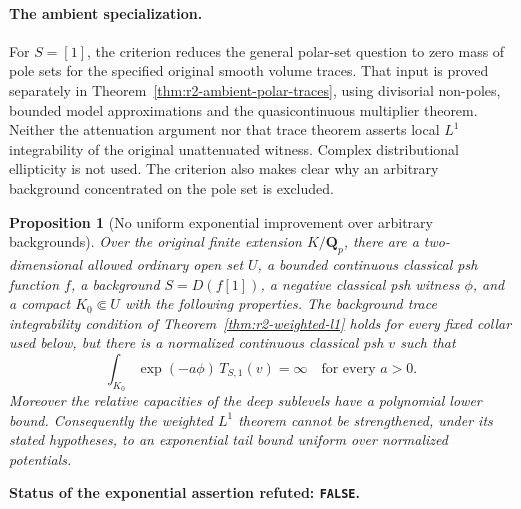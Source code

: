 \documentclass[11pt,a4paper]{article}
\numberwithin{equation}{section}
\newtheorem{proposition}[theorem]{Proposition}
\theoremstyle{definition}
\theoremstyle{remark}
\begin{document}
\paragraph{The ambient specialization.}
For $S=[1]$, the criterion reduces the general polar-set question to
zero mass of pole sets for the specified original smooth volume
traces. That input is proved separately in
Theorem~\ref{thm:r2-ambient-polar-traces}, using divisorial
non-poles, bounded model approximations and the quasicontinuous
multiplier theorem. Neither the attenuation argument nor that
trace theorem asserts local $L^1$ integrability of the original
unattenuated witness. Complex distributional ellipticity is not
used. The criterion also makes clear why an arbitrary background
concentrated on the pole set is excluded.

\begin{proposition}[No uniform exponential improvement over arbitrary backgrounds]
\label{prop:r2-no-exponential-tails}
Over the original finite extension $K/\mathbf Q_p$, there are a
two-dimensional allowed ordinary open set $U$, a bounded continuous
classical psh function $f$, a background $S=D(f[1])$, a negative
classical psh witness $\phi$, and a compact $K_0\Subset U$ with
the following properties. The background trace integrability
condition of Theorem~\ref{thm:r2-weighted-l1} holds for every
fixed collar used below, but there is a normalized continuous
classical psh $v$ such that
\[
 \int_{K_0}\exp(-a\phi)\,T_{S,1}(v)=\infty
                   \quad\text{for every }a>0.
\]
Moreover the relative capacities of the deep sublevels have a
polynomial lower bound. Consequently the weighted $L^1$ theorem
cannot be strengthened, under its stated hypotheses, to an
exponential tail bound uniform over normalized potentials.
\end{proposition}

\noindent\textbf{Status of the exponential assertion refuted:
\texttt{FALSE}.}
\end{document}
